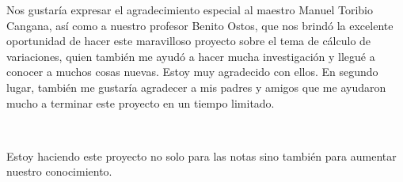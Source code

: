 Nos gustaría expresar el agradecimiento especial al maestro Manuel Toribio Cangana, así como a nuestro profesor Benito Ostos, que nos brindó la excelente oportunidad de hacer este maravilloso proyecto sobre el tema de cálculo de variaciones, quien también me ayudó a hacer mucha investigación y llegué a conocer a muchos cosas nuevas. Estoy muy agradecido con ellos. En segundo lugar, también me gustaría agradecer a mis padres y amigos que me ayudaron mucho a terminar este proyecto en un tiempo limitado.\par

\

Estoy haciendo este proyecto no solo para las notas sino también para aumentar nuestro conocimiento.